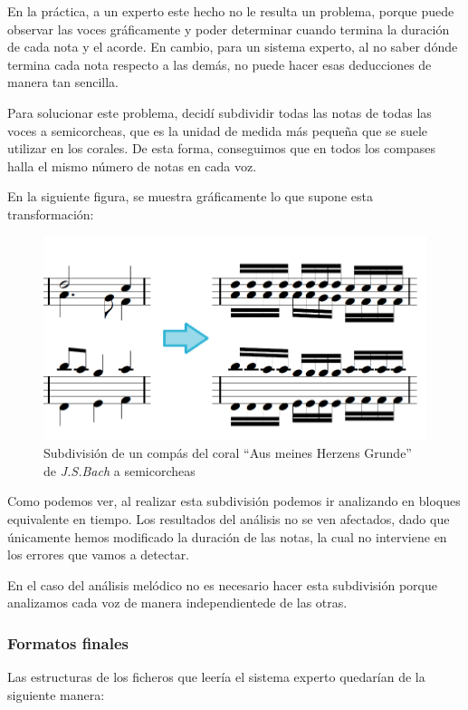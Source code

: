 En la práctica, a un experto este hecho no le resulta un problema, porque puede observar las voces gráficamente y poder determinar cuando termina la duración de cada nota y el acorde. En cambio, para un sistema experto, al no saber dónde termina cada nota respecto a las demás, no puede hacer esas deducciones de manera tan sencilla. 

Para solucionar este problema, decidí subdividir todas las notas de todas las voces a semicorcheas, que es la unidad de medida más pequeña que se suele utilizar en los corales. De esta forma, conseguimos que en todos los compases halla el mismo número de notas en cada voz.

En la siguiente figura, se muestra gráficamente lo que supone esta transformación:


\begin{figure}[H]
	\centering
	\includegraphics[scale=0.5]{imagenes/division.png}
	\caption{Subdivisión de un compás del coral ``Aus meines Herzens Grunde'' de \textit{J.S.Bach} a semicorcheas}
	\label{fig5.1.1}
\end{figure}

Como podemos ver, al realizar esta subdivisión podemos ir analizando en bloques equivalente en tiempo. Los resultados del análisis no se ven afectados, dado que únicamente hemos modificado la duración de las notas, la cual no interviene en los errores que vamos a detectar.

En el caso del análisis melódico no es necesario hacer esta subdivisión porque analizamos cada voz de manera independientede de las otras.

\subsubsection{Formatos finales}

Las estructuras de los ficheros que leería el sistema experto quedarían de la siguiente manera:

